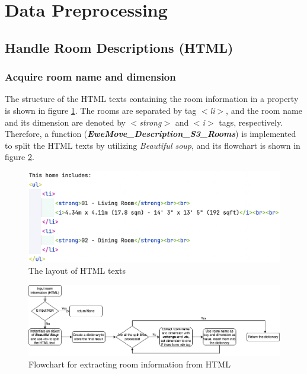 \documentclass[12pt,twoside]{report}
\begin{document}
\section{Data Preprocessing}

\subsection{Handle Room Descriptions (HTML)}
\subsubsection{Acquire room name and dimension}
The structure of the HTML texts containing the room information in a property is shown in figure \ref{html_structure}. The rooms are separated by tag \textit{$<$li$>$}, and the room name and its dimension are denoted by \textit{$<$strong$>$} and \textit{$<$i$>$} tags, respectively. Therefore, a function (\textit{\textbf{EweMove\_Description\_S3\_Rooms}}) is implemented to split the HTML texts by utilizing \textit{Beautiful soup}, and its flowchart is shown in figure \ref{html_room_info}.
\begin{figure}[H]
	\centering
	\includegraphics[width=15cm]{html_structure}
	\caption{The layout of HTML texts}
	\label{html_structure}
\end{figure}

\begin{figure}[!htbp]
	\centering
	\includegraphics[width=1\linewidth]{html_room_info}
	\caption{Flowchart for extracting room information from HTML}
	\label{html_room_info}
\end{figure}
\end{document}
